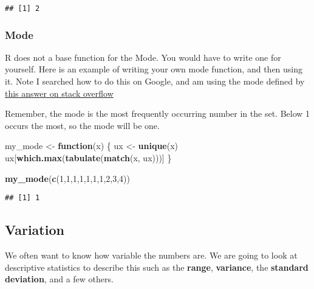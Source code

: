 \documentclass[
]{book}
\newenvironment{Shaded}{\begin{snugshade}}{\end{snugshade}}
\newcommand{\ControlFlowTok}[1]{\textcolor[rgb]{0.13,0.29,0.53}{\textbf{#1}}}
\newcommand{\DecValTok}[1]{\textcolor[rgb]{0.00,0.00,0.81}{#1}}
\newcommand{\FunctionTok}[1]{\textcolor[rgb]{0.13,0.29,0.53}{\textbf{#1}}}
\newcommand{\NormalTok}[1]{#1}
\newcommand{\OtherTok}[1]{\textcolor[rgb]{0.56,0.35,0.01}{#1}}
\begin{document}
\begin{verbatim}
## [1] 2
\end{verbatim}

\hypertarget{mode}{%
\subsubsection{Mode}\label{mode}}

R does not a base function for the Mode. You would have to write one for yourself. Here is an example of writing your own mode function, and then using it. Note I searched how to do this on Google, and am using the mode defined by \href{https://stackoverflow.com/questions/2547402/is-there-a-built-in-function-for-finding-the-mode}{this answer on stack overflow}

Remember, the mode is the most frequently occurring number in the set. Below 1 occurs the most, so the mode will be one.

\begin{Shaded}
\begin{Highlighting}[]
\NormalTok{my\_mode }\OtherTok{\textless{}{-}} \ControlFlowTok{function}\NormalTok{(x) \{}
\NormalTok{  ux }\OtherTok{\textless{}{-}} \FunctionTok{unique}\NormalTok{(x)}
\NormalTok{  ux[}\FunctionTok{which.max}\NormalTok{(}\FunctionTok{tabulate}\NormalTok{(}\FunctionTok{match}\NormalTok{(x, ux)))]}
\NormalTok{\}}

\FunctionTok{my\_mode}\NormalTok{(}\FunctionTok{c}\NormalTok{(}\DecValTok{1}\NormalTok{,}\DecValTok{1}\NormalTok{,}\DecValTok{1}\NormalTok{,}\DecValTok{1}\NormalTok{,}\DecValTok{1}\NormalTok{,}\DecValTok{1}\NormalTok{,}\DecValTok{1}\NormalTok{,}\DecValTok{2}\NormalTok{,}\DecValTok{3}\NormalTok{,}\DecValTok{4}\NormalTok{))}
\end{Highlighting}
\end{Shaded}

\begin{verbatim}
## [1] 1
\end{verbatim}

\hypertarget{variation}{%
\subsection{Variation}\label{variation}}

We often want to know how variable the numbers are. We are going to look at descriptive statistics to describe this such as the \textbf{range}, \textbf{variance}, the \textbf{standard deviation}, and a few others.
\end{document}
